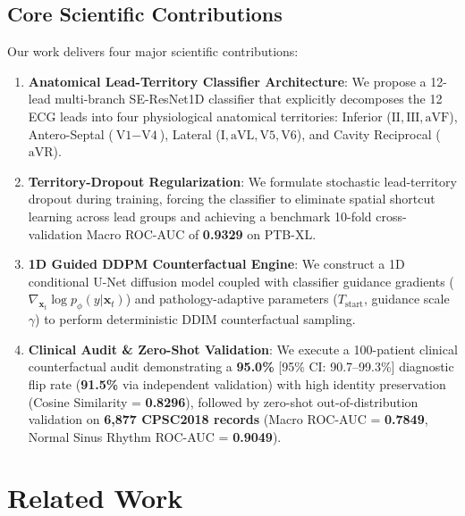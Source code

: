 \documentclass[12pt]{elsarticle}
\begin{document}
\subsection{Core Scientific Contributions}
Our work delivers four major scientific contributions:
\begin{enumerate}
    \item \textbf{Anatomical Lead-Territory Classifier Architecture}: We propose a 12-lead multi-branch SE-ResNet1D classifier that explicitly decomposes the 12 ECG leads into four physiological anatomical territories: Inferior ($\text{II}, \text{III}, \text{aVF}$), Antero-Septal ($\text{V1}-\text{V4}$), Lateral ($\text{I}, \text{aVL}, \text{V5}, \text{V6}$), and Cavity Reciprocal ($\text{aVR}$).
    \item \textbf{Territory-Dropout Regularization}: We formulate stochastic lead-territory dropout during training, forcing the classifier to eliminate spatial shortcut learning across lead groups and achieving a benchmark 10-fold cross-validation Macro ROC-AUC of \textbf{0.9329} on PTB-XL.
    \item \textbf{1D Guided DDPM Counterfactual Engine}: We construct a 1D conditional U-Net diffusion model coupled with classifier guidance gradients ($\nabla_{\mathbf{x}_t} \log p_\phi(y|\mathbf{x}_t)$) and pathology-adaptive parameters ($T_{\text{start}}$, guidance scale $\gamma$) to perform deterministic DDIM counterfactual sampling.
    \item \textbf{Clinical Audit \& Zero-Shot Validation}: We execute a 100-patient clinical counterfactual audit demonstrating a \textbf{95.0\%} [95\% CI: 90.7--99.3\%] diagnostic flip rate (\textbf{91.5\%} via independent validation) with high identity preservation (Cosine Similarity = \textbf{0.8296}), followed by zero-shot out-of-distribution validation on \textbf{6,877 CPSC2018 records} (Macro ROC-AUC = \textbf{0.7849}, Normal Sinus Rhythm ROC-AUC = \textbf{0.9049}).
\end{enumerate}

\section{Related Work}
\label{sec:related}
\end{document}

